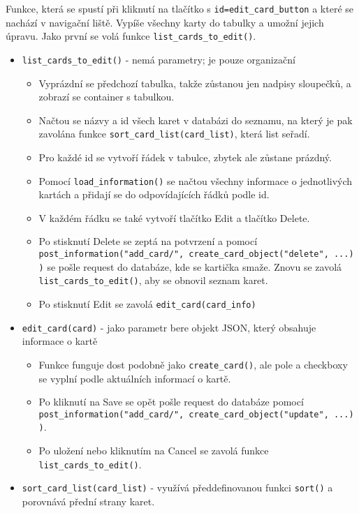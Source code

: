 \documentclass[11pt]{article}
\providecommand{\tightlist}{\setlength{\itemsep}{1pt}\setlength{\parskip}{1pt}}
\let\oldtexttt\texttt
\renewcommand{\texttt}[1]{\oldtexttt{\textcolor{codehighlight}{#1}}}
\begin{document}
Funkce, která se spustí při kliknutí na tlačítko s
\texttt{id=edit\_card\_button} a které se nachází v navigační liště.
Vypíše všechny karty do tabulky a umožní jejich úpravu. Jako první se
volá funkce \texttt{list\_cards\_to\_edit()}.

\begin{itemize}
\tightlist
\item
  \texttt{list\_cards\_to\_edit()} - nemá parametry; je pouze
  organizační

  \begin{itemize}
  \tightlist
  \item
    Vyprázdní se předchozí tabulka, takže zůstanou jen nadpisy
    sloupečků, a zobrazí se container s tabulkou.
  \item
    Načtou se názvy a id všech karet v databázi do seznamu, na který je
    pak zavolána funkce \texttt{sort\_card\_list(card\_list)}, která
    list seřadí.
  \item
    Pro každé id se vytvoří řádek v tabulce, zbytek ale zůstane prázdný.
  \item
    Pomocí \texttt{load\_information()} se načtou všechny informace o
    jednotlivých kartách a přidají se do odpovídajících řádků podle id.
  \item
    V každém řádku se také vytvoří tlačítko Edit a tlačítko Delete.
  \item
    Po stisknutí Delete se zeptá na potvrzení a pomocí
    \texttt{post\_information("add\_card/",\ create\_card\_object("delete",\ ...))}
    se pošle request do databáze, kde se kartička smaže. Znovu se zavolá
    \texttt{list\_cards\_to\_edit()}, aby se obnovil seznam karet.
  \item
    Po stisknutí Edit se zavolá \texttt{edit\_card(card\_info)}
  \end{itemize}
\item
  \texttt{edit\_card(card)} - jako parametr bere objekt JSON, který
  obsahuje informace o kartě

  \begin{itemize}
  \tightlist
  \item
    Funkce funguje dost podobně jako \texttt{create\_card()}, ale pole a
    checkboxy se vyplní podle aktuálních informací o kartě.
  \item
    Po kliknutí na Save se opět pošle request do databáze pomocí
    \texttt{post\_information("add\_card/",\ create\_card\_object("update",\ ...))}.
  \item
    Po uložení nebo kliknutím na Cancel se zavolá funkce
    \texttt{list\_cards\_to\_edit()}.
  \end{itemize}
\item
  \texttt{sort\_card\_list(card\_list)} - využívá předdefinovanou funkci
  \texttt{sort()} a porovnává přední strany karet.
\end{itemize}
\end{document}
